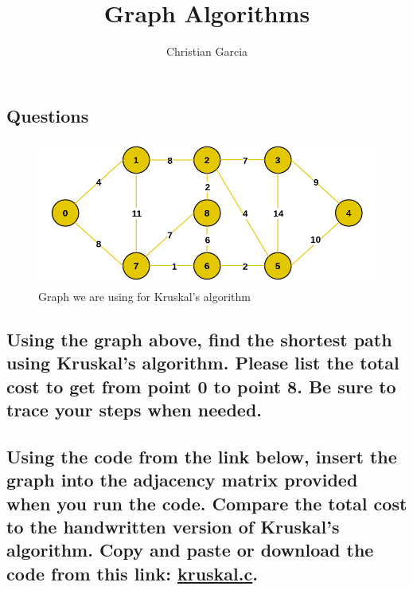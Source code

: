 \documentclass{article}
\title{Graph Algorithms}
\author{Christian Garcia}
\begin{document}
\maketitle


\begin{Huge}
\section*{Questions}
\end{Huge}

\begin{figure}[!h]
\includegraphics[width=\linewidth]{kruskalgraph.png}
\caption{Graph we are using for Kruskal's algorithm}
\end{figure}

\subsection{Using the graph above, find the shortest path using Kruskal's algorithm. Please list the total cost to get from point 0 to point 8. Be sure to trace your steps when needed. }

\pagebreak{}

\subsection{Using the code from the link below, insert the graph into the adjacency matrix provided when you run the code. Compare the total cost to the handwritten version of Kruskal's algorithm. Copy and paste or download the code from this link: \href{https://github.com/ehawkvu/ds-n-a/blob/master/graphing/kruskal.c}{kruskal.c}.}

\vspace{36pt}
\end{document}
